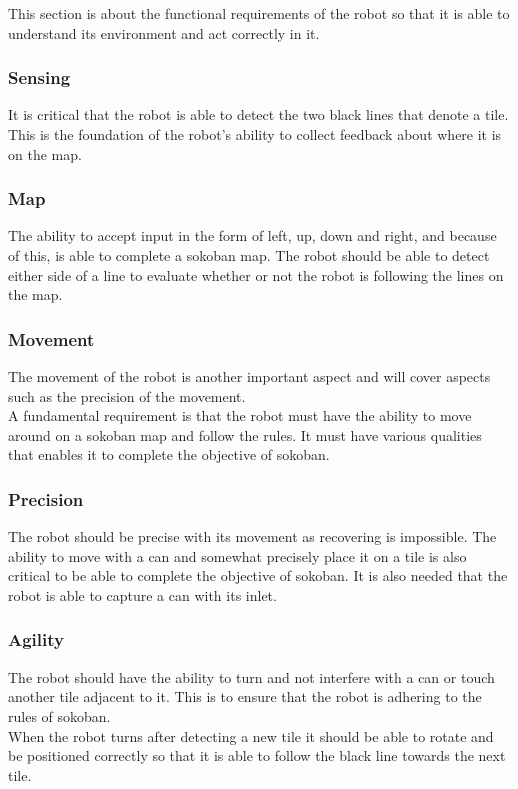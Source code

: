 \documentclass[../../main.tex]{subfiles}
\begin{document}
This section is about the functional requirements of the robot so that it is able to understand its environment and act correctly in it.

\subsubsection{Sensing}%
\label{sub:sensing}

It is critical that the robot is able to detect the two black lines that denote a tile. This is the foundation of the robot's ability to collect feedback about where it is on the map.

\subsubsection{Map}%
\label{ssub:map}

The ability to accept input in the form of left, up, down and right, and because of this, is able to complete a sokoban map.
The robot should be able to detect either side of a line to evaluate whether or not the robot is following the lines on the map.

\subsubsection{Movement}%
\label{sub:movement}

The movement of the robot is another important aspect and will cover aspects such as the precision of the movement.\\
A fundamental requirement is that the robot must have the ability to move around on a sokoban map and follow the rules. It must have various qualities that enables it to complete the objective of sokoban.

\subsubsection{Precision}%
\label{ssub:precision}

The robot should be precise with its movement as recovering is impossible.
The ability to move with a can and somewhat precisely place it on a tile is also critical to be able to complete the objective of sokoban. It is also needed that the robot is able to capture a can with its inlet.

\subsubsection{Agility}%
\label{ssub:agility}

The robot should have the ability to turn and not interfere with a can or touch another tile adjacent to it. This is to ensure that the robot is adhering to the rules of sokoban. \\
When the robot turns after detecting a new tile it should be able to rotate and be positioned correctly so that it is able to follow the black line towards the next tile.
	
\end{document}
